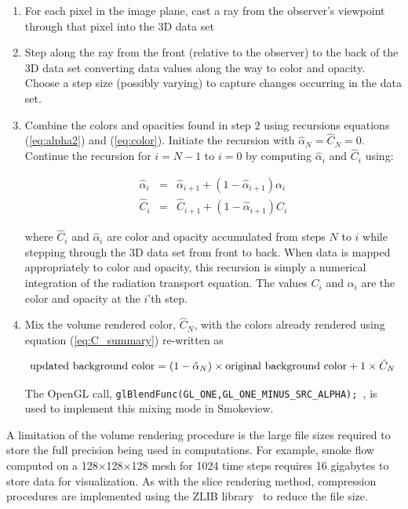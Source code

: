 {\begin{enumerate}

\item For each pixel in the image plane, cast a ray from the observer's viewpoint through that pixel into the 3D data set

\item Step along the ray from the front (relative to the observer) to the back of the 3D data set converting data values along the way to color and opacity.  Choose a step size (possibly varying) to capture changes occurring in the data set.

\item
Combine the colors and opacities found in step 2 using recursions equations (\ref{eq:alpha2}) and (\ref{eq:color}).
Initiate the recursion with $\hat{\alpha}_{N}=\hat{C}_{N}=0$. Continue the recursion for $i=N-1$ to $i=0$ by computing $\hat{\alpha}_i$ and $\hat{C}_i$ using:

\begin{eqnarray}
\hat{\alpha}_i&=&\hat{\alpha}_{i+1}+\left(1-\hat{\alpha}_{i+1}\right)\alpha_i\\
\hat{C}_i&=&\hat{C}_{i+1}+\left(1-\hat{\alpha}_{i+1}\right)C_i
\end{eqnarray}

where $\hat{C}_i$ and $\hat{\alpha}_i$ are color and opacity accumulated from steps $N$ to $i$ while stepping through the 3D data set from front to back.  When data is mapped appropriately to color and opacity, this recursion is simply a numerical integration of the radiation transport equation.
The values $C_i$ and $\alpha_i$ are the color and opacity at the $i$'th step.

\item Mix the volume rendered color, $\hat{C}_N$, with the colors already rendered using equation (\ref{eq:C_summary}) re-written as

\begin{eqnarray}
\noindent\mbox{updated background color} = (1-\hat{\alpha}_N)\times \mbox{original background color} + 1\times\hat{C}_N
\end{eqnarray}

The OpenGL call, {\tt   glBlendFunc(GL\_ONE,GL\_ONE\_MINUS\_SRC\_ALPHA); }, is used to implement this mixing mode in Smokeview.
\end{enumerate}

A limitation of the volume rendering procedure is the large file sizes required to store the full precision being used in computations.
For example, smoke flow computed on a 128$\times$128$\times$128 mesh for 1024 time steps requires 16 gigabytes to store data for visualization.
As with the slice rendering method, compression procedures are implemented using the ZLIB library~\cite{ZLIB} to reduce the file size.


}
